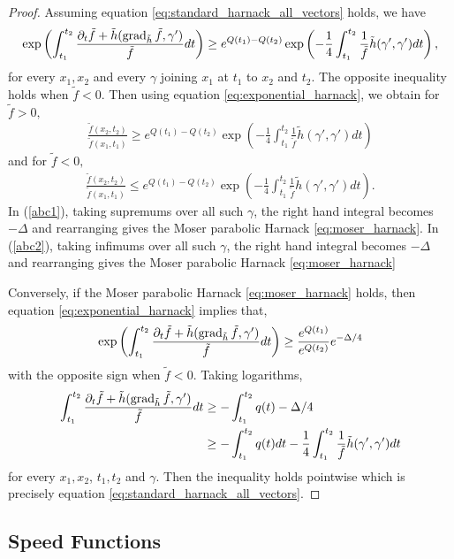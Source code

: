 \begin{proof}
Assuming equation \eqref{eq:standard_harnack_all_vectors} holds, we have
\[
\exp\left(\int_{t_1}^{t_2} \frac{\partial_t \tilde{f} + \tilde{h} (\operatorname{grad}_{\tilde{h}} \tilde{f}, \gamma')}{\tilde{f}} dt\right) \geq e^{Q(t_1) - Q(t_2)} \exp\left(- \frac{1}{4} \int_{t_1}^{t_2} \frac{1}{\tilde{f}} \tilde{h}(\gamma', \gamma') dt\right),
\]
for every $x_1, x_2$ and every $\gamma$ joining $x_1$ at $t_1$ to $x_2$ and $t_2$. The opposite inequality holds when $\tilde{f} < 0$. Then using equation \eqref{eq:exponential_harnack}, we obtain for $\tilde{f}>0,$
\begin{align}\label{abc1}
\frac{\tilde{f} (x_2, t_2)}{\tilde{f} (x_1, t_1)} \geq e^{Q(t_1) - Q(t_2)} \exp\left(- \frac{1}{4} \int_{t_1}^{t_2} \frac{1}{\tilde{f}} \tilde{h}(\gamma', \gamma') dt\right)
\end{align}
and for $\tilde{f}<0,$
\begin{align}\label{abc2}
\frac{\tilde{f} (x_2, t_2)}{\tilde{f} (x_1, t_1)} \leq e^{Q(t_1) - Q(t_2)} \exp\left(- \frac{1}{4} \int_{t_1}^{t_2} \frac{1}{\tilde{f}} \tilde{h}(\gamma', \gamma') dt\right).
\end{align}
In (\ref{abc1}), taking supremums over all such $\gamma$, the right hand integral becomes $-\Delta$ and rearranging gives the Moser parabolic Harnack \eqref{eq:moser_harnack}. In (\ref{abc2}), taking infimums over all such $\gamma$, the right hand integral becomes $-\Delta$ and rearranging gives the Moser parabolic Harnack \eqref{eq:moser_harnack}

Conversely, if the Moser parabolic Harnack \eqref{eq:moser_harnack} holds, then equation \eqref{eq:exponential_harnack} implies that,
\[
\exp \left(\int_{t_1}^{t_2} \frac{\partial_t \tilde{f} + \tilde{h} (\operatorname{grad}_{\tilde{h}} \tilde{f}, \gamma')}{\tilde{f}} dt\right) \geq \frac{e^{Q(t_1)}}{e^{Q(t_2)}} e^{-\Delta/4}
\]
with the opposite sign when $\tilde{f} < 0$. Taking logarithms,
\[
\begin{split}
\int_{t_1}^{t_2} \frac{\partial_t \tilde{f} + \tilde{h} (\operatorname{grad}_{\tilde{h}} \tilde{f}, \gamma')}{\tilde{f}} dt &\geq -\int_{t_1}^{t_2} q(t) - \Delta/4 \\
&\geq - \int_{t_1}^{t_2} q(t) dt -  \frac{1}{4} \int_{t_1}^{t_2} \frac{1}{\tilde{f}} \tilde{h}(\gamma', \gamma') dt
\end{split}
\]
for every $x_1, x_2$, $t_1, t_2$ and $\gamma$. Then the inequality holds pointwise which is precisely equation \eqref{eq:standard_harnack_all_vectors}.
\end{proof}

\subsection{Speed Functions}
\label{subsec:bg_speed}
